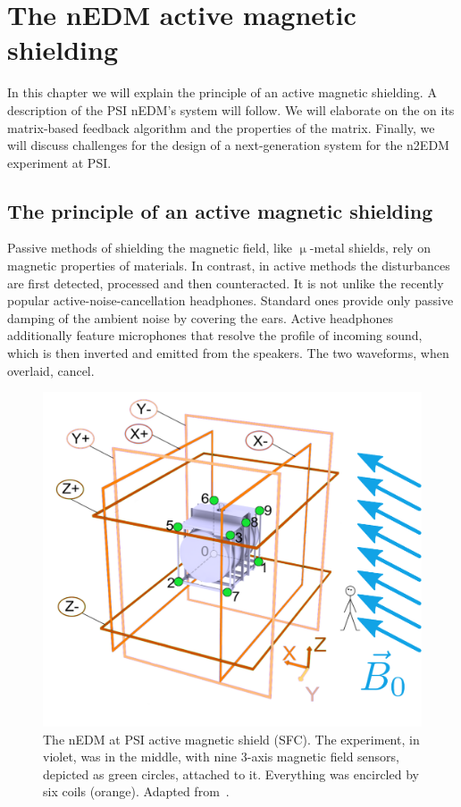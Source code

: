 \chapter{The nEDM active magnetic shielding}

\label{ch:nedm_sfc}
In this chapter we will explain the principle of an active magnetic shielding. A description of the PSI nEDM's system will follow. We will elaborate on the on its matrix-based feedback algorithm and the properties of the matrix. Finally, we will discuss challenges for the design of a next-generation system for the n2EDM experiment at PSI\@.




\section{The principle of an active magnetic shielding}
Passive methods of shielding the magnetic field, like $\upmu$-metal shields, rely on magnetic properties of materials. In contrast, in active methods the disturbances are first detected, processed and then counteracted. It is not unlike the recently popular active-noise-cancellation headphones. Standard ones provide only passive damping of the ambient noise by covering the ears. Active headphones additionally feature microphones that resolve the profile of incoming sound, which is then inverted and emitted from the speakers. The two waveforms, when overlaid, cancel.

\begin{figure}
  \centering
  \includegraphics[width=0.8\linewidth]{gfx/nEDM_SFC/SFCplain.pdf}
  \caption{The nEDM at PSI active magnetic shield (SFC). The experiment, in violet, was in the middle, with nine 3-axis magnetic field sensors, depicted as green circles, attached to it. Everything was encircled by six coils (orange). Adapted from~\cite{Franke2013}.}\label{fig:sfc-scheme}
\end{figure}

